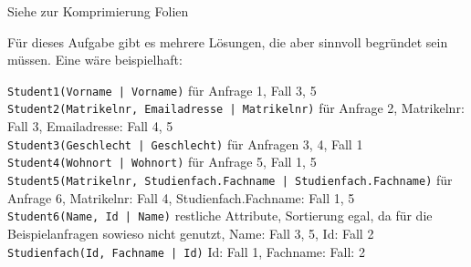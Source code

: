 \begin{note}
	Siehe zur Komprimierung Folien~\CStoreMethode

	Für dieses Aufgabe gibt es mehrere Lösungen, die aber sinnvoll begründet sein müssen. Eine wäre beispielhaft:

	\texttt{Student1(Vorname | Vorname)} für Anfrage 1, Fall 3, 5\\
	\texttt{Student2(Matrikelnr, Emailadresse | Matrikelnr)} für Anfrage 2, Matrikelnr: Fall 3, Emailadresse: Fall 4, 5\\
	\texttt{Student3(Geschlecht | Geschlecht)} für Anfragen 3, 4, Fall 1\\
	\texttt{Student4(Wohnort | Wohnort)} für Anfrage 5, Fall 1, 5\\
	\texttt{Student5(Matrikelnr, Studienfach.Fachname | Studienfach.Fachname)} für Anfrage 6, Matrikelnr: Fall 4, Studienfach.Fachname: Fall 1, 5 \\
	\texttt{Student6(Name, Id | Name)} restliche Attribute, Sortierung egal, da für die Beispielanfragen sowieso nicht genutzt, Name: Fall 3, 5, Id: Fall 2 \\
	\texttt{Studienfach(Id, Fachname | Id)} Id: Fall 1, Fachname: Fall: 2
\end{note}
